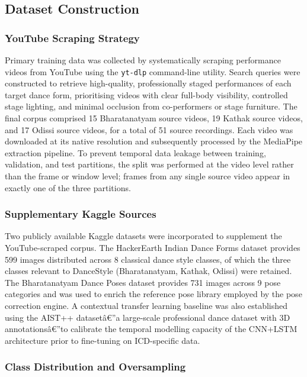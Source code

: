 \documentclass[journal]{IEEEtran}
\begin{document}
\subsection{Dataset Construction}

\subsubsection{YouTube Scraping Strategy}

Primary training data was collected by systematically scraping
performance videos from YouTube using the \texttt{yt-dlp} command-line
utility. Search queries were constructed to retrieve high-quality,
professionally staged performances of each target dance form, prioritising
videos with clear full-body visibility, controlled stage lighting, and
minimal occlusion from co-performers or stage furniture. The final
corpus comprised 15 Bharatanatyam source videos, 19 Kathak source
videos, and 17 Odissi source videos, for a total of 51 source recordings.
Each video was downloaded at its native resolution and subsequently
processed by the MediaPipe extraction pipeline. To prevent temporal
data leakage between training, validation, and test partitions, the
split was performed at the video level rather than the frame or window
level; frames from any single source video appear in exactly one of the
three partitions.

\subsubsection{Supplementary Kaggle Sources}

Two publicly available Kaggle datasets were incorporated to supplement
the YouTube-scraped corpus. The HackerEarth Indian Dance Forms dataset
provides 599 images distributed across 8 classical dance style classes,
of which the three classes relevant to DanceStyle (Bharatanatyam, Kathak,
Odissi) were retained. The Bharatanatyam Dance Poses dataset provides
731 images across 9 pose categories and was used to enrich the
reference pose library employed by the pose correction engine. A
contextual transfer learning baseline was also established using the
AIST++ datasetâ€”a large-scale professional dance dataset with 3D
annotationsâ€”to calibrate the temporal modelling capacity of the
CNN+LSTM architecture prior to fine-tuning on ICD-specific data.

\subsubsection{Class Distribution and Oversampling}
\end{document}
